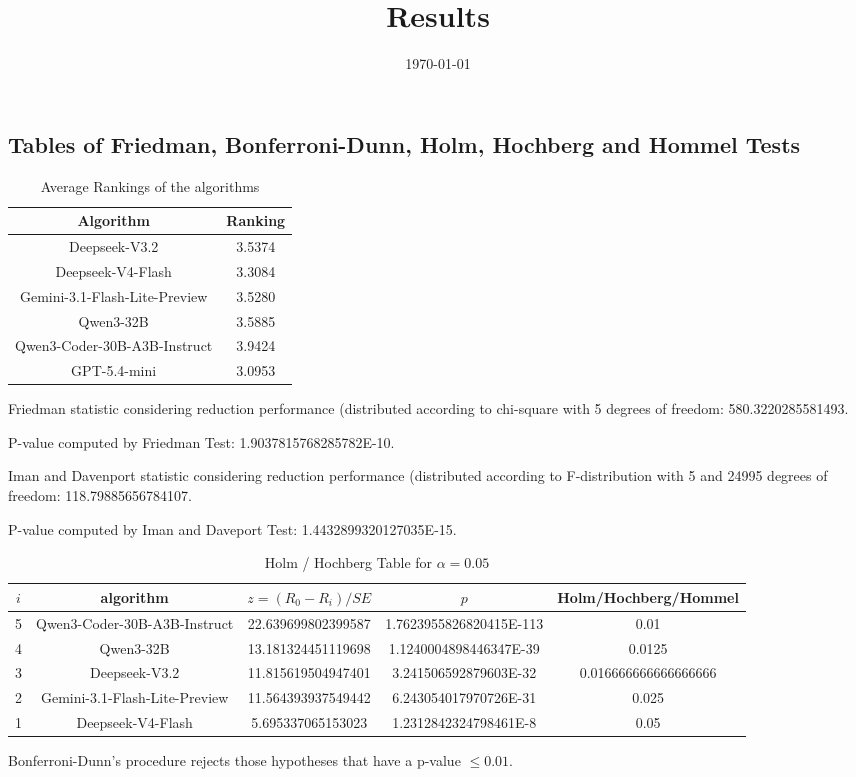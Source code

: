 \documentclass[a4paper,10pt]{article}
\title{Results}
\date{\today}
\begin{document}
\begin{landscape}
\oddsidemargin 0in \topmargin 0in\maketitle
\section{Tables of Friedman, Bonferroni-Dunn, Holm, Hochberg and Hommel Tests}
\begin{table}[!htp]
\centering
\caption{Average Rankings of the algorithms
}\begin{tabular}{c|c}
Algorithm&Ranking\\
\hline
Deepseek-V3.2&3.5374\\
Deepseek-V4-Flash&3.3084\\
Gemini-3.1-Flash-Lite-Preview&3.5280\\
Qwen3-32B&3.5885\\
Qwen3-Coder-30B-A3B-Instruct&3.9424\\
GPT-5.4-mini&3.0953\\
\end{tabular}
\end{table}


Friedman statistic considering reduction performance (distributed according to chi-square with 5 degrees of freedom: 580.3220285581493.


P-value computed by Friedman Test: 1.9037815768285782E-10.\newline

Iman and Davenport statistic considering reduction performance (distributed according to F-distribution with 5 and 24995 degrees of freedom: 118.79885656784107.


P-value computed by Iman and Daveport Test: 1.4432899320127035E-15.\newline

\begin{table}[!htp]
\centering\tiny
\caption{Holm / Hochberg Table for $\alpha=0.05$}
\begin{tabular}{ccccc}
$i$&algorithm&$z=(R_0 - R_i)/SE$&$p$&Holm/Hochberg/Hommel\\
\hline
5&Qwen3-Coder-30B-A3B-Instruct&22.639699802399587&1.7623955826820415E-113&0.01\\
4&Qwen3-32B&13.181324451119698&1.1240004898446347E-39&0.0125\\
3&Deepseek-V3.2&11.815619504947401&3.241506592879603E-32&0.016666666666666666\\
2&Gemini-3.1-Flash-Lite-Preview&11.564393937549442&6.243054017970726E-31&0.025\\
1&Deepseek-V4-Flash&5.695337065153023&1.2312842324798461E-8&0.05\\
\hline
\end{tabular}
\end{table}
Bonferroni-Dunn's procedure rejects those hypotheses that have a p-value $\le0.01$.



\end{landscape}
\end{document}
